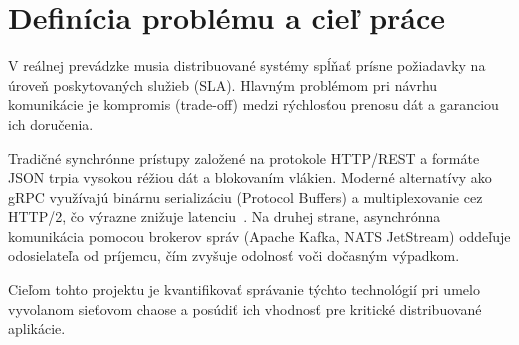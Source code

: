 \section{Definícia problému a cieľ práce} \label{s: problem}

V reálnej prevádzke musia distribuované systémy spĺňať prísne požiadavky na úroveň poskytovaných služieb (SLA). Hlavným problémom pri návrhu komunikácie je kompromis (trade-off) medzi rýchlosťou prenosu dát a garanciou ich doručenia.

Tradičné synchrónne prístupy založené na protokole HTTP/REST a formáte JSON trpia vysokou réžiou dát a blokovaním vlákien. Moderné alternatívy ako gRPC využívajú binárnu serializáciu (Protocol Buffers) a multiplexovanie cez HTTP/2, čo výrazne znižuje latenciu~\cite{Indrasiri2020}. Na druhej strane, asynchrónna komunikácia pomocou brokerov správ (Apache Kafka, NATS JetStream) oddeľuje odosielateľa od príjemcu, čím zvyšuje odolnosť voči dočasným výpadkom.

Cieľom tohto projektu je kvantifikovať správanie týchto technológií pri umelo vyvolanom sieťovom chaose a posúdiť ich vhodnosť pre kritické distribuované aplikácie.